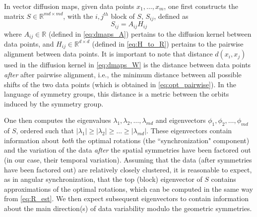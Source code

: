 \documentclass{pnastwo}
\begin{document}
\begin{article}
In vector diffusion maps, given data points $x_1, \dots, x_m$, one first constructs the matrix $S \in \mathbb{R}^{md \times md}$, with the $i,j^{th}$ block of $S$, $S_{ij}$, defined as
\begin{equation} \label{eq:vdm_S}
	S_{ij} = A_{ij} H_{ij}
\end{equation}
%
where $A_{ij} \in \mathbb{R}$ (defined in \eqref{eq:dmaps_A}) pertains to the diffusion kernel between data points, and $H_{ij} \in \mathbb{R}^{d \times d}$ (defined in \eqref{eq:H_to_R}) pertains to the pairwise alignment between data points.
%
It is important to note that distance $d(x_i, x_j)$ used in the diffusion kernel in \eqref{eq:dmaps_W} is the distance between data points {\it after} after pairwise alignment, i.e., the minimum distance between all possible shifts of the two data points (which is obtained in \eqref{eq:opt_pairwise}).
%
In the language of symmetry groups, this distance is a metric between the orbits induced by the symmetry group.

One then computes the eigenvalues $\lambda_1, \lambda_2, \dots, \lambda_{md}$ and eigenvectors $\phi_1, \phi_2, \dots, \phi_{md}$ of $S$, ordered such that $|\lambda_1| \ge |\lambda_2| \ge \dots \ge |\lambda_{md}|$.
%
These eigenvectors contain information about {\it both} the optimal rotations (the ``synchronization" component) and the
variation of the data {\it after} the spatial symmetries have been factored out (in our case, their temporal variation).
%
Assuming that the data (after symmetries have been factored out) are relatively closely clustered, it is reasonable
to expect, as in angular synchronization, that the top (block) eigenvector of $S$ contains approximations of the optimal rotations,
which can be computed in the same way from \eqref{eq:R_est}.
%
We then expect subsequent eigenvectors to contain information about the main direction(s) of data variability modulo the geometric symmetries.
%


\end{article}
\end{document}
